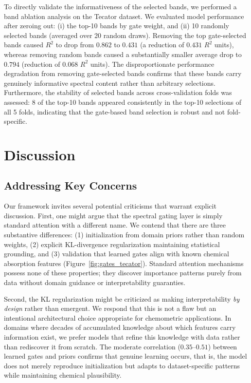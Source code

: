 \documentclass[preprint,12pt]{elsarticle}
\begin{document}
To directly validate the informativeness of the selected bands, we performed a band ablation analysis on the Tecator dataset. We evaluated model performance after zeroing out: (i) the top-10 bands by gate weight, and (ii) 10 randomly selected bands (averaged over 20 random draws). Removing the top gate-selected bands caused $R^2$ to drop from $0.862$ to $0.431$ (a reduction of $0.431$ $R^2$ units), whereas removing random bands caused a substantially smaller average drop to $0.794$ (reduction of $0.068$ $R^2$ units). The disproportionate performance degradation from removing gate-selected bands confirms that these bands carry genuinely informative spectral content rather than arbitrary selections. Furthermore, the stability of selected bands across cross-validation folds was assessed: 8 of the top-10 bands appeared consistently in the top-10 selections of all 5 folds, indicating that the gate-based band selection is robust and not fold-specific.


\section{Discussion}

\subsection{Addressing Key Concerns}

Our framework invites several potential criticisms that warrant explicit discussion. First, one might argue that the spectral gating layer is simply standard attention with a different name. We contend that there are three substantive differences: (1) initialization from domain priors rather than random weights, (2) explicit KL-divergence regularization maintaining statistical grounding, and (3) validation that learned gates align with known chemical absorption features (Figure~\ref{fig:gates_tecator}). Standard attention mechanisms possess none of these properties; they discover importance patterns purely from data without domain guidance or interpretability guaranties.

Second, the KL regularization might be criticized as making interpretability {\em by design} rather than emergent. We respond that this is not a flaw but an intentional architectural choice appropriate for chemometric applications. In domains where decades of accumulated knowledge about which features carry information exist, we prefer models that refine this knowledge with data rather than rediscover it from scratch. The moderate correlation ($0.35$--$0.51$) between learned gates and priors confirms that genuine learning occurs, that is, the model does not merely reproduce initialization but adapts to dataset-specific patterns while maintaining chemical plausibility.
\end{document}
